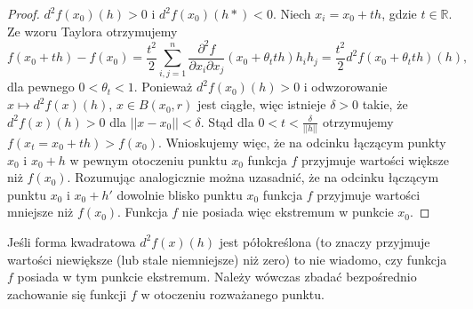 \documentclass[leqno]{article}
\begin{document}
\begin{justify}
\begin{proof}
    $d^2 f(x_0)(h) > 0$ i $d^2 f(x_0)(h*) < 0$. Niech $x_i = x_0 + th$, gdzie $t \in \mathbb{R}$. Ze wzoru Taylora otrzymujemy 
    \[
        f(x_0 + th) - f(x_0) = \frac{t^2}{2}\sum_{i,j=1}^{n}\frac{\partial ^2 f}{\partial x_i \partial x_j}(x_0 + \theta_t th)h_i h_j = \frac{t^2}{2}d^2f(x_0 + \theta_t th)(h),
    \]
    dla pewnego $0 < \theta_t < 1$. Ponieważ $d^2 f(x_0)(h) > 0$ i odwzorowanie $x \mapsto d^2 f(x)(h)$, $x \in B(x_0, r)$ jest ciągłe, więc istnieje $\delta > 0$
    takie, że $d^2f(x)(h) > 0 $ dla $||x - x_0|| < \delta$. Stąd dla $0 < t < \frac{\delta}{||h||}$ otrzymujemy $f(x_t = x_0 + th) > f(x_0)$. Wnioskujemy więc, że 
    na odcinku łączącym punkty $x_0$ i $x_0 + h$ w pewnym otoczeniu punktu $x_0$ funkcja $f$ przyjmuje wartości większe niż $f(x_0)$. Rozumując analogicznie można uzasadnić,
    że na odcinku łączącym punktu $x_0$ i $x_0 + h'$ dowolnie blisko punktu $x_0$ funkcja $f$ przyjmuje wartości mniejsze niż $f(x_0)$. Funkcja $f$ nie posiada więc ekstremum w punkcie $x_0$.
\end{proof}

\begin{uwaga}
    Jeśli forma kwadratowa $d^2 f(x)(h)$ jest półokreślona (to znaczy przyjmuje wartości niewiększe (lub stale niemniejsze) niż zero) to nie wiadomo, czy funkcja 
    $f$ posiada w tym punkcie ekstremum. Należy wówczas zbadać bezpośrednio zachowanie się funkcji $f$ w otoczeniu rozważanego punktu. 
\end{uwaga}


\end{justify}
\end{document}
